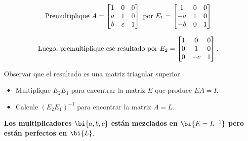 \begin{enumerate}
\begin{displaymath}
\hbox{Premultiplique }  A=\begin{bmatrix}
    1 & 0 & 0\\ a & 1 & 0\\ b & c & 1
  \end{bmatrix} \text{ por } E_1=
  \begin{bmatrix}
  1& 0& 0\\-a&1&0\\-b&0&1
\end{bmatrix}
\end{displaymath}

\begin{displaymath}
\hbox{Luego, premultiplique ese resultado por } E_2=
  \begin{bmatrix}1&0&0\\0&1&0\\0&-c&1\\
  \end{bmatrix}.
\end{displaymath}

Observar que el resultado es una matriz triagular superior.

%
%

\begin{itemize}
\item[(a)] Multiplique $E_{2}E_{1}$ para encontrar la matriz $E$ que produce $EA=I$.
\item[(b)] Calcule $(E_2E_1)^{-1}$ para encontrar la matriz $A=L$.
\end{itemize}

\textbf{Los multiplicadores $\bi{a, b, c}$ están mezclados en $\bi{E=L^{-1}}$ pero est\'an perfectos en $\bi{L}$}.



\end{enumerate}
